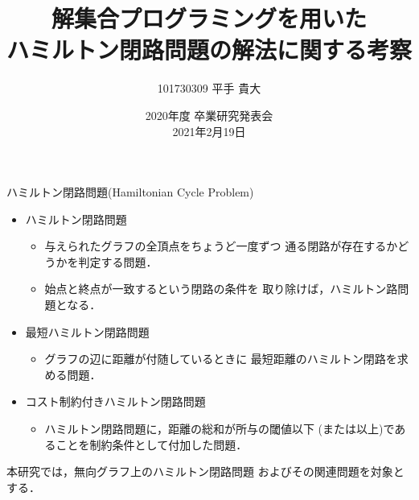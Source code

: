 \documentclass[dvipdfmx,10pt]{beamer}
\title{解集合プログラミングを用いた\\ハミルトン閉路問題の解法に関する考察}
\author{101730309 平手 貴大}
\institute{番原研究室}
\date{2020年度 卒業研究発表会\\2021年2月19日}
\begin{document}

\frame{\maketitle}

\begin{frame}{ハミルトン閉路問題(Hamiltonian Cycle Problem)}
  \begin{itemize}
  \item \alert{ハミルトン閉路問題}
    \begin{itemize}
    \item 与えられたグラフの全頂点をちょうど一度ずつ
      通る閉路が存在するかどうかを判定する問題．
    \item 始点と終点が一致するという閉路の条件を
      取り除けば，ハミルトン路問題となる．
    \end{itemize}
  \item \alert{最短ハミルトン閉路問題}
    \begin{itemize}
    \item グラフの辺に距離が付随しているときに
      最短距離のハミルトン閉路を求める問題．
    \end{itemize}
  \item \alert{コスト制約付きハミルトン閉路問題}
    \begin{itemize}
    \item ハミルトン閉路問題に，距離の総和が所与の閾値以下
      (または以上)であることを制約条件として付加した問題．
    \end{itemize}
  \end{itemize}
  \begin{alertblock}{}
    本研究では，無向グラフ上のハミルトン閉路問題
    およびその関連問題を対象とする．    
  \end{alertblock}
\end{frame}
\end{document}

